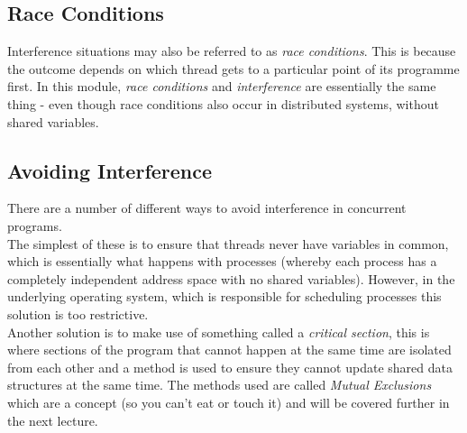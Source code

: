 \subsection{Race Conditions}
Interference situations may also be referred to as \textit{race conditions}. This is because the outcome depends on which thread gets to a particular point of its programme first. In this module, \textit{race conditions} and \textit{interference} are essentially the same thing - even though race conditions also occur in distributed systems, without shared variables.

\subsection{Avoiding Interference}
There are a number of different ways to avoid interference in concurrent programs.\\

The simplest of these is to ensure that threads never have variables in common, which is essentially what happens with processes (whereby each process has a completely independent address space with no shared variables). However, in the underlying operating system, which is responsible for scheduling processes this solution is too restrictive.\\

Another solution is to make use of something called a \textit{critical section}, this is where sections of the program that cannot happen at the same time are isolated from each other and a method is used to ensure they cannot update shared data structures at the same time. The methods used are called \textit{Mutual Exclusions} which are a concept (so you can't eat or touch it) and will be covered further in the next lecture.